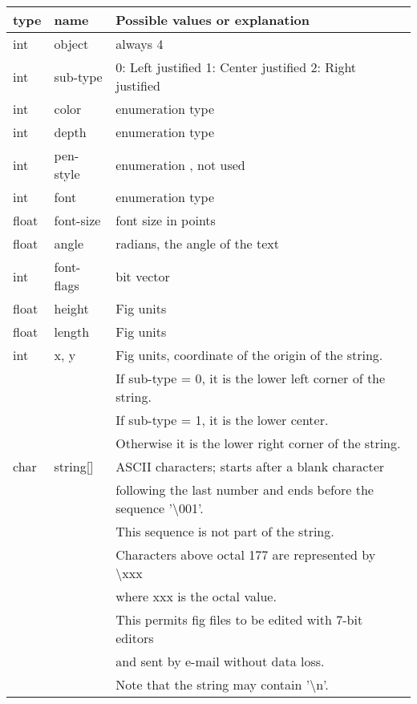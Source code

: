 \documentclass[10pt, a4paper]{article}
\begin{document}
\begin{tabular}{|lll|}
\hline
type & name & Possible values or explanation \\
\hline
\hline
int     & object     & always 4 \\
int     & sub-type   & 0: Left justified
                                             1: Center justified
                                             2: Right justified \\
int     & color      & enumeration type \\
int     & depth      & enumeration type \\
int     & pen-style  & enumeration , not used \\
int     & font       & enumeration type \\
float   & font-size  & font size in points \\
float   & angle      & radians, the angle of the text \\
int     & font-flags & bit vector \\
float   & height     & Fig units \\
float   & length     & Fig units \\
int     & x, y       & Fig units, coordinate of the origin of the string.  \\
&&                     If sub-type = 0, 
                       it is the lower left corner of the string.\\
&&                     If sub-type = 1, 
                       it is the lower center.  \\
&&                     Otherwise it is the lower right corner of the string. \\
char    & string[]   & ASCII characters; 
                       starts after a blank character \\
&&                     following the last number and
                       ends before the sequence '\textbackslash 001'.  \\
&&                     This sequence is not part of the string.\\
&&                     Characters above octal 177 are
                       represented by \textbackslash xxx\\
&&                     where xxx is the octal value.  \\
&&                     This permits fig files to
                       be edited with 7-bit editors \\
&&                     and sent by e-mail without data loss.\\
&&                     Note that the string may contain '\textbackslash n'. \\
\hline
\end{tabular}
\end{document}
